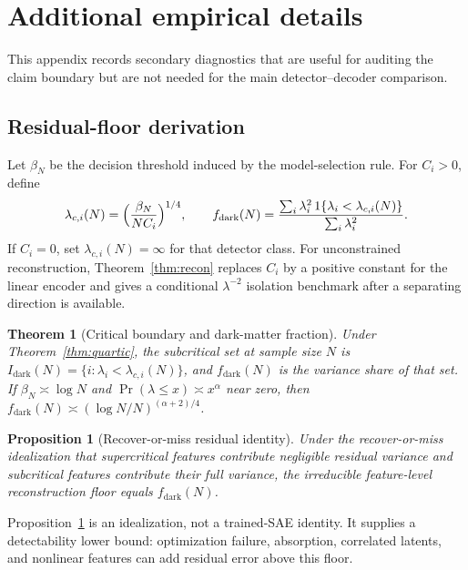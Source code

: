 \documentclass{article}
\theoremstyle{plain}
\newtheorem{theorem}{Theorem}
\newtheorem{proposition}{Proposition}
\begin{document}
\appendix
{\footnotesize
\section{Additional empirical details}
\label{app:additional}
This appendix records secondary diagnostics that are useful for auditing the claim boundary but are not needed for the main detector--decoder comparison.

\subsection{Residual-floor derivation}
\label{app:additional_floor}
Let $\beta_N$ be the decision threshold induced by the model-selection rule. For $C_i>0$, define
\begin{equation}
\lambda_{c,i}(N)=\Bigl(\frac{\beta_N}{N C_i}\Bigr)^{1/4},\qquad
f_{\mathrm{dark}}(N)=\frac{\sum_i \lambda_i^2\,1\{\lambda_i<\lambda_{c,i}(N)\}}{\sum_i \lambda_i^2}.
\end{equation}
If $C_i=0$, set $\lambda_{c,i}(N)=\infty$ for that detector class. For unconstrained reconstruction, Theorem~\ref{thm:recon} replaces $C_i$ by a positive constant for the linear encoder and gives a conditional $\lambda^{-2}$ isolation benchmark after a separating direction is available.

\begin{theorem}[Critical boundary and dark-matter fraction]
\label{thm:floor}
Under Theorem~\ref{thm:quartic}, the subcritical set at sample size $N$ is $I_{\mathrm{dark}}(N)=\{i:\lambda_i<\lambda_{c,i}(N)\}$, and $f_{\mathrm{dark}}(N)$ is the variance share of that set. If $\beta_N\asymp\log N$ and $\Pr(\lambda\le x)\asymp x^{\alpha}$ near zero, then $f_{\mathrm{dark}}(N)\asymp(\log N/N)^{(\alpha+2)/4}$.
\end{theorem}

\begin{proposition}[Recover-or-miss residual identity]
\label{prop:rom}
Under the recover-or-miss idealization that supercritical features contribute negligible residual variance and subcritical features contribute their full variance, the irreducible feature-level reconstruction floor equals $f_{\mathrm{dark}}(N)$.
\end{proposition}

Proposition~\ref{prop:rom} is an idealization, not a trained-SAE identity. It supplies a detectability lower bound: optimization failure, absorption, correlated latents, and nonlinear features can add residual error above this floor.

}
\end{document}
